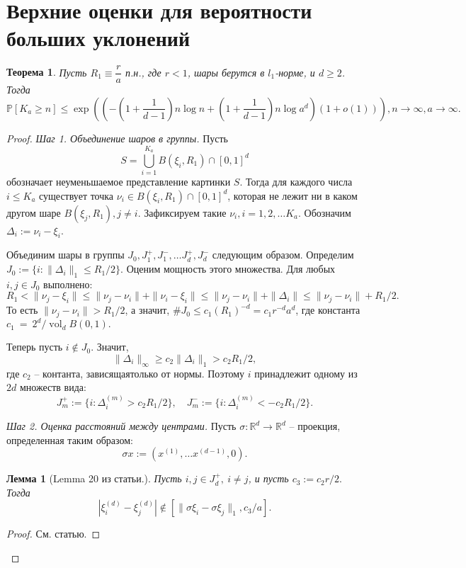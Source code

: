 \documentclass[12pt]{article}
\theoremstyle{plain}
\newtheorem{thm}{Теорема} %
\newtheorem{lm}{Лемма}
\theoremstyle{definition}
\theoremstyle{remark}
\def\geq{\geqslant}
\def\leq{\leqslant}
\DeclareMathOperator{\vol}{vol}
\newcommand{\R}{\mathbb{R}}
\newcommand{\PP}{\mathbb{P}}
\begin{document}
\section{Верхние оценки для вероятности больших уклонений}

\begin{thm}
Пусть $R_1\equiv \dfrac{r}{a}$ п.н., где $r<1$, шары берутся в $l_1$-норме, и $d\geq 2$. 
Тогда $$\PP[K_a \geq n] \leq \exp \left(\left(-\left(1+\dfrac{1}{d-1}\right)n\log n + \left(1 + \dfrac{1}{d-1}\right)n\log a^d \right)(1 + o(1))\right), n \to \infty, a\to \infty.$$
\end{thm}{}

\begin{proof}
{\it Шаг 1. Объединение шаров в группы.} Пусть $$S = \bigcup_{i=1}^{K_a} B(\xi_i, R_1) \cap [0,1]^d$$ обозначает неуменьшаемое представление картинки $S$. Тогда для каждого числа $i\leq K_a$ существует точка $\nu_i\in B(\xi_i, R_1) \cap [0,1]^d$, которая не лежит ни в каком другом шаре $B(\xi_j, R_1), j \not= i$. Зафиксируем такие $\nu_i, i = 1, 2, \ldots K_a$. Обозначим $\Delta_i := \nu_i - \xi_i$.

Объединим шары в группы $J_0, J_1^+, J_1^-, \ldots J_d^+, J_d^-$ следующим образом. Определим $J_0 := \{i \colon \|\Delta_i\|_1 \leq R_1/2\}$. Оценим мощность этого множества. Для любых $i, j \in J_0$ выполнено:
$$R_1 < \|\nu_j - \xi_i\| \leq \|\nu_j - \nu_i\| + \|\nu_i - \xi_i\| \leq 
\|\nu_j - \nu_i\| + \|\Delta_i\| \leq \|\nu_j - \nu_i\| + R_1/2.$$
То есть $\|\nu_j-\nu_i\|> R_1/2$, а значит, $\#J_0 \leq c_1(R_1)^{-d} = c_1r^{-d}a^d$, где константа $c_1~=~2^d/\vol_d B(0,1).$

Теперь пусть $i\not\in J_0$. Значит, $$\|\Delta_i\|_\infty \geq c_2\|\Delta_i\|_1 > c_2R_1/2,$$ где $c_2$ -- контанта, зависящаятолько от нормы. Поэтому $i$ принадлежит одному из $2d$ множеств вида: $$J_m^+ := \{i\colon \Delta_i^{(m)} > c_2R_1/2\}, \quad J_m^- := \{i\colon \Delta_i^{(m)} < - c_2R_1/2\}.$$

{\it Шаг 2. Оценка расстояний между центрами.} Пусть $\sigma \colon \R^d \to \R^d$ -- проекция, определенная таким образом: $$\sigma x := (x^{(1)}, \ldots x^{(d-1)}, 0).$$ 

\begin{lm}[Lemma 20 из статьи.]
Пусть $i, j\in J_d^+, \ i\not= j$, и пусть $c_3 := c_2 r/2.$ Тогда $$|\xi_i^{(d)} - \xi_j^{(d)}| \not\in [\|\sigma\xi_i - \sigma\xi_j\|_1, c_3/a].$$
\end{lm}{}
\begin{proof}
См. статью.
\end{proof}{}


\end{proof}
\end{document}
